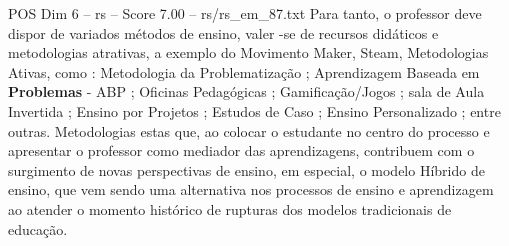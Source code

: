 \begin{textsample}{POS Dim 6 – rs – Score 7.00 – rs/rs\_em\_87.txt}
Para tanto, o professor deve dispor de variados métodos de ensino, valer -se de recursos didáticos e metodologias atrativas, a exemplo do Movimento Maker, Steam, Metodologias Ativas, como : Metodologia da Problematização ; Aprendizagem Baseada em \textbf{Problemas} - ABP ; Oficinas Pedagógicas ; Gamificação/Jogos ; sala de Aula Invertida ; Ensino por Projetos ; Estudos de Caso ; Ensino Personalizado ; entre outras.
Metodologias estas que, ao colocar o estudante no centro do processo e apresentar o professor como mediador das aprendizagens, contribuem com o surgimento de novas perspectivas de ensino, em especial, o modelo Híbrido de ensino, que vem sendo uma alternativa nos processos de ensino e aprendizagem ao atender o momento histórico de rupturas dos modelos tradicionais de educação.

\end{textsample}
